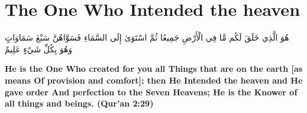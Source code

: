\chapter{The One Who Intended the heaven}
\begin{center}
    {\Huge    
        \begin{Arabic}
            هُوَ الَّذِي خَلَقَ لَكُم مَّا فِي الْأَرْضِ جَمِيعًا ثُمَّ اسْتَوَىٰ إِلَى السَّمَاءِ فَسَوَّاهُنَّ سَبْعَ سَمَاوَاتٍ وَهُوَ بِكُلِّ شَيْءٍ عَلِيمٌ
        \end{Arabic}
    }    
\end{center}
\vspace*{\fill}
\vspace{3cm}
\begin{center}
    \large \textbf{He is the One Who created for you all Things that are on the earth [as means Of provision and comfort]; then He Intended the heaven and He gave order And perfection to the Seven Heavens; He is the Knower of all things and beings. (Qur'an 2:29)}
\end{center}
